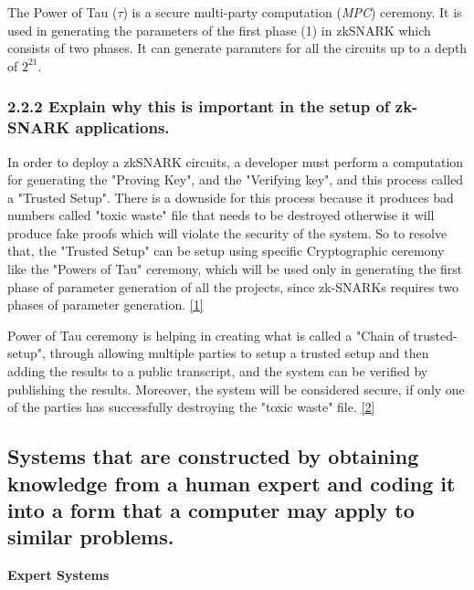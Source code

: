 \documentclass[letterpaper, 10 pt, conference]{ieeeconf}  %
\begin{document}
The Power of Tau ($\tau$) is a secure multi-party computation (\textit{MPC}) ceremony. It is used in generating the parameters of the first phase (1) in zkSNARK which consists of two phases. It can generate paramters for all the circuits up to a depth of $2^{21}$. 

\subsubsection{\textbf{2.2.2 Explain why this is important in the setup of zk-SNARK applications.}}


In order to deploy a zkSNARK circuits, a developer must perform a computation for generating the "Proving Key", and the "Verifying key", and this process called a "Trusted Setup". There is a downside for this process because it produces bad numbers called "toxic waste" file that needs to be destroyed otherwise it will produce fake proofs which will violate the security of the system. So to resolve that, the "Trusted Setup" can be setup using specific Cryptographic ceremony like the "Powers of Tau" ceremony, which will be used only in generating the first phase of parameter generation of all the projects, since zk-SNARKs requires two phases of parameter generation. \href{https://medium.com/coinmonks/announcing-the-perpetual-powers-of-tau-ceremony-to-benefit-all-zk-snark-projects-c3da86af8377#:~:text=The%20Powers%20of%20Tau%20ceremony,protocol%20can%20be%20publicly%20verified.&text=Nevertheless%2C%20each%20ceremony%20takes%20time%20and%20is%20tedious%20to%20coordinate.}{[1]}

Power of Tau ceremony is helping in creating what is called a "Chain of trusted-setup", through allowing multiple parties to setup a trusted setup and then adding the results to a public transcript, and the system can be verified by publishing the results. Moreover, the system will be considered secure, if only one of the parties has successfully destroying the "toxic waste" file. \href{https://blog.hermez.io/hermez-zero-knowledge-proofs/}{[2]}


\subsection{Systems that are constructed by obtaining knowledge from a human expert and coding it into
a form that a computer may apply to similar problems.}
\begin{flushright}
\textbf{Expert Systems}
\end{flushright}
\end{document}
